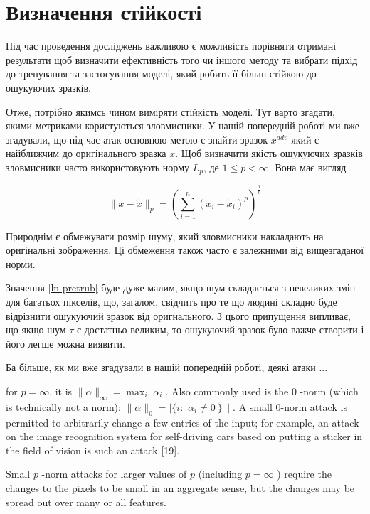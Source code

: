 \documentclass[14pt,a4paper]{extarticle}
\newcounter{e}
\numberwithin{equation}{section}
\numberwithin{figure}{section}
\begin{document}
 \newpage
 \thispagestyle{empty}
 \section{Визначення стійкості}
 
 Під час проведення досліджень важливою є можливість порівняти отримані результати щоб визначити ефективність того чи іншого методу та вибрати підхід до тренування та застосування моделі, який робить її більш стійкою до ошукуючих зразків.
 
 Отже, потрібно якимсь чином виміряти стійкість моделі. Тут варто згадати, якими метриками користуються зловмисники. У нашій попередній роботі \cite{my-work} ми вже згадували, що під час атак основною метою є знайти зразок $x^{adv}$ який є найближчим до оригінального зразка $x$.
 Щоб визначити якість ошукуючих зразків зловмисники часто використовують норму  $L_p$, де $1 \leq p<\infty$. Вона має вигляд
 
 \begin{equation}
 \label{ln-pretrub}
 \|x-\tilde{x}\|_{p}=\left(\sum_{i=1}^{n}\left(x_{i}-\tilde{x}_{i}\right)^{p}\right)^{\frac{1}{n}}
 \end{equation}
 
 
 
 
 Природнім є обмежувати розмір шуму, який зловмисники накладають на оригінальні зображення. Ці обмеження також часто є залежними від вищезгаданої норми.
 
 Значення \ref{ln-pretrub} буде дуже малим, якщо шум складається з невеликих змін для багатьох пікселів, що, загалом, свідчить про те що людині складно буде відрізнити ошукуючий зразок від оригнального. З цього припущення випливає, що якщо шум $\tau$ є достатньо великим, то ошукуючий зразок було важче створити і його легше можна виявити.
 
 Ба більше, як ми вже згадували в нашій попередній роботі, деякі атаки ...
 


 for $p=\infty$, it is $\|\alpha\|_{\infty}=\max _{i}\left|\alpha_{i}\right|$. Also commonly used is
 the 0 -norm (which is technically not a norm): $\|\alpha\|_{0}=\mid\{i:$ $\left.\alpha_{i} \neq 0\right\} \mid .$ A small 0-norm attack is permitted to arbitrarily change a few entries of the input; for example, an attack on the image recognition system for self-driving cars based on putting a sticker in the field of vision is such an attack [19].
 
 
 Small $p$ -norm attacks for larger values of $p$ (including $p=\infty$ ) require the changes to the pixels to be small in an aggregate sense, but the changes may be spread out over many or all features.
 
\end{document}
